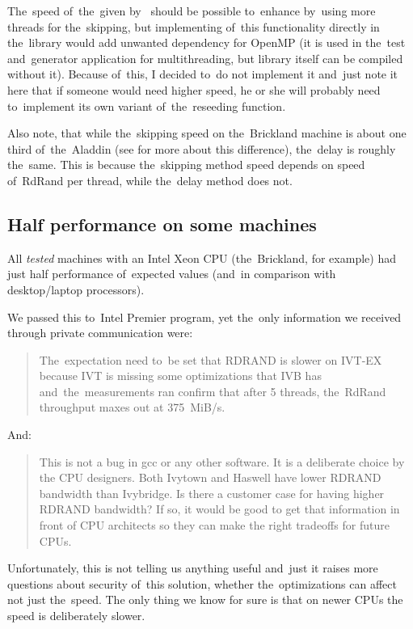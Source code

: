 \par{
The~speed of~the~given by~ should be possible to~enhance by~using more threads for the~skipping, but implementing of~this functionality directly in the~library would add unwanted dependency for OpenMP (it is used in the~test and~generator application for multithreading, but library itself can be compiled without it). Because of~this, I decided to~do not implement it and~just note it here that if someone would need higher speed, he or she will probably need to~implement its own variant of~the~reseeding function.
}

\par{
Also note, that while the~skipping speed on the~Brickland machine is about one third of~the~Aladdin (see  for more about this difference), the~delay is roughly the~same. This is because the~skipping method speed depends on speed of~RdRand per thread, while the~delay method does not.
}

\subsection{Half performance on some machines}\label{subsec:testing:halfPerf}

\par{All {\em tested} machines with an Intel Xeon CPU (the~Brickland, for example) had just half performance of~expected values (and~in comparison with desktop/laptop processors).
}

\par{
We passed this to~Intel Premier program, yet the~only information we received through private communication were:
\begin{quote} %
The~expectation need to~be set that RDRAND is slower on IVT-EX 
because IVT is missing some optimizations that IVB has 
and~the~measurements ran confirm that after 5 threads, 
the~RdRand throughput maxes out at 375~MiB/s.
\end{quote}
And:
\begin{quote} %
This is not a bug in gcc or any other software.  It is a deliberate choice by the CPU designers.  Both Ivytown and Haswell have lower RDRAND bandwidth than Ivybridge.  Is there a customer case for having higher RDRAND bandwidth?  If so, it would be good to get that information in front of CPU architects so they can make the right tradeoffs for future CPUs.
\end{quote}
Unfortunately, this is not telling us anything useful and~just it raises more 
questions about security of~this solution, whether the~optimizations can affect not just the~speed. The only thing we know for sure is that on newer CPUs the speed is deliberately slower.
}

